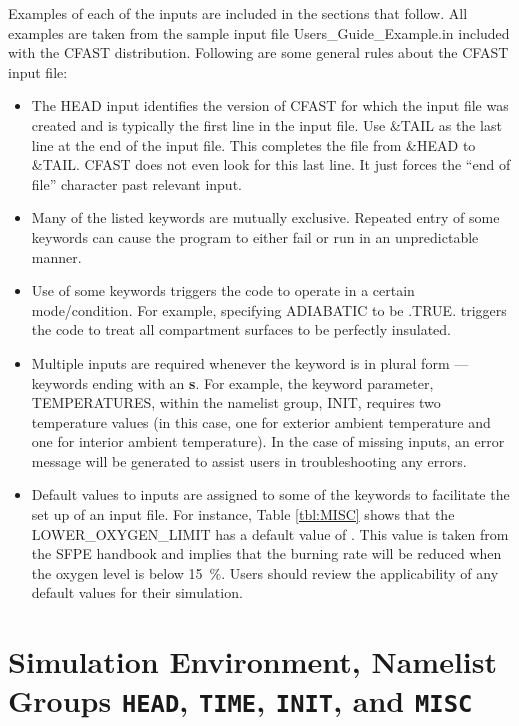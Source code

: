 Examples of each of the inputs are included in the sections that follow.  All examples are taken from the sample input file {\ct Users\_Guide\_Example.in} included with the CFAST distribution. Following are some general rules about the CFAST input file:

\begin{itemize}
\item The {\ct HEAD} input identifies the version of CFAST for which the input file was created and is typically the first line in the input file. Use {\ct \&TAIL} as the last line at the end of the input file. This completes the file from {\ct \&HEAD} to {\ct \&TAIL}. CFAST does not even look for this last line. It just forces the “end of file” character past relevant input.
\item Many of the listed keywords are mutually exclusive. Repeated entry of some keywords can cause the program to either fail or run in an unpredictable manner.
\item Use of some keywords triggers the code to operate in a certain mode/condition. For example, specifying {\ct ADIABATIC} to be {\ct .TRUE.} triggers the code to treat all compartment surfaces to be perfectly insulated.
\item Multiple inputs are required whenever the keyword is in plural form --- keywords ending with an \textbf{s}. For example, the keyword parameter, {\ct TEMPERATURES}, within the namelist group, {\ct INIT}, requires two temperature values (in this case, one for exterior ambient temperature and one for interior ambient temperature). In the case of missing inputs, an error message will be generated to assist users in troubleshooting any errors.
\item Default values to inputs are assigned to some of the keywords to facilitate the set up of an input file. For instance, Table \ref{tbl:MISC} shows that the {\ct LOWER\_OXYGEN\_LIMIT} has a default value of {}. This value is taken from the SFPE handbook \cite{SFPE:2003} and implies that the burning rate will be reduced when the oxygen level is below 15~\%. Users should review the applicability of any default values for their simulation.
\end{itemize}


\clearpage

\section{Simulation Environment, Namelist Groups \texorpdfstring{{\tt HEAD}}{HEAD}, \texorpdfstring{{\tt TIME}}{TIME}, \texorpdfstring{{\tt INIT}}{INIT}, and  \texorpdfstring{{\tt MISC}}{MISC}}

